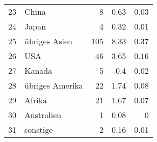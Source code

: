 \begin{longtable}{lXrrr}
        23 & \multicolumn{1}{X}{China} & %
          \num{8} &
          \num[round-mode=places,round-precision=2]{0,63} &
          \num[round-mode=places,round-precision=2]{0,03} \\

        24 & \multicolumn{1}{X}{Japan} & %
          \num{4} &
          \num[round-mode=places,round-precision=2]{0,32} &
          \num[round-mode=places,round-precision=2]{0,01} \\

        25 & \multicolumn{1}{X}{übriges Asien} & %
          \num{105} &
          \num[round-mode=places,round-precision=2]{8,33} &
          \num[round-mode=places,round-precision=2]{0,37} \\

        26 & \multicolumn{1}{X}{USA} & %
          \num{46} &
          \num[round-mode=places,round-precision=2]{3,65} &
          \num[round-mode=places,round-precision=2]{0,16} \\

        27 & \multicolumn{1}{X}{Kanada} & %
          \num{5} &
          \num[round-mode=places,round-precision=2]{0,4} &
          \num[round-mode=places,round-precision=2]{0,02} \\

        28 & \multicolumn{1}{X}{übriges Amerika} & %
          \num{22} &
          \num[round-mode=places,round-precision=2]{1,74} &
          \num[round-mode=places,round-precision=2]{0,08} \\

        29 & \multicolumn{1}{X}{Afrika} & %
          \num{21} &
          \num[round-mode=places,round-precision=2]{1,67} &
          \num[round-mode=places,round-precision=2]{0,07} \\

        30 & \multicolumn{1}{X}{Australien} & %
          \num{1} &
          \num[round-mode=places,round-precision=2]{0,08} &
          \num[round-mode=places,round-precision=2]{0} \\

        31 & \multicolumn{1}{X}{sonstige} & %
          \num{2} &
          \num[round-mode=places,round-precision=2]{0,16} &
          \num[round-mode=places,round-precision=2]{0,01} \\


\end{longtable}
